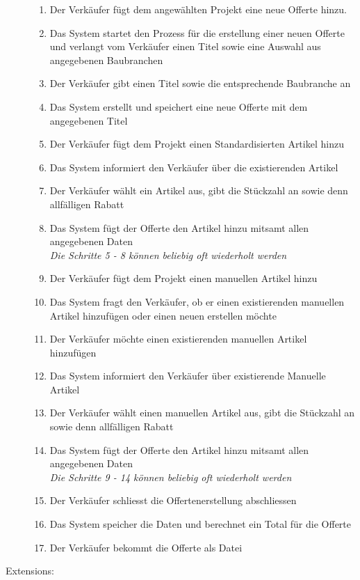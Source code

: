 \documentclass[journal]{combine}
\begin{document}
\begin{description}
\begin{enumerate}
			\item Der Verkäufer fügt dem angewählten Projekt eine neue Offerte hinzu.
			\item Das System startet den Prozess für die erstellung einer neuen Offerte und
			verlangt vom Verkäufer einen Titel sowie eine Auswahl aus angegebenen Baubranchen
			\item Der Verkäufer gibt einen Titel sowie die entsprechende Baubranche an
			\item Das System erstellt und speichert eine neue Offerte mit dem 
				angegebenen Titel
			\item Der Verkäufer fügt dem Projekt einen Standardisierten Artikel hinzu
			\item Das System informiert den Verkäufer über die existierenden Artikel
			\item Der Verkäufer wählt ein Artikel aus, gibt die Stückzahl an sowie 
			denn allfälligen Rabatt
			\item Das System fügt der Offerte den Artikel hinzu mitsamt allen angegebenen Daten\\
			\emph{Die Schritte 5 - 8 können beliebig oft wiederholt werden}
			\item Der Verkäufer fügt dem Projekt einen manuellen Artikel hinzu
			\item Das System fragt den Verkäufer, ob er einen existierenden manuellen Artikel hinzufügen 
			oder einen neuen erstellen möchte
			\item Der Verkäufer möchte einen existierenden manuellen Artikel hinzufügen
			\item Das System informiert den Verkäufer über existierende Manuelle Artikel
			\item Der Verkäufer wählt einen manuellen Artikel aus, gibt die Stückzahl an sowie 
			denn allfälligen Rabatt
			\item Das System fügt der Offerte den Artikel hinzu mitsamt allen angegebenen Daten\\
			\emph{Die Schritte 9 - 14 können beliebig oft wiederholt werden}
			\item Der Verkäufer schliesst die Offertenerstellung abschliessen
			\item Das System speicher die Daten und berechnet ein Total für die Offerte
			\item Der Verkäufer bekommt die Offerte als Datei
		\end{enumerate}
		\newpage
		\item[Extensions:] \hfill  
		\begin{enumerate}

\end{enumerate}
\end{description}
\end{document}
